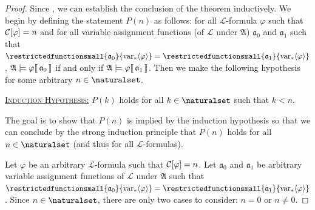 \begin{proof}
    Since , we can establish the conclusion
    of the theorem inductively.
    We begin by defining the statement \( P(n) \) as follows: for all \( \mathcal{L} \)-formula \( \varphi \) such that
    \( \folcomplexityofformula{\varphi} = n \) and for all variable assignment functions (of \( \mathcal{L} \) under \( \mathfrak{A} \))
    \( \mathfrak{a}_{0} \) and \( \mathfrak{a}_{1} \) such that
    \( \restrictedfunctionsmall{\mathfrak{a}_{0}}{ \folfreevars{\varphi} } = \restrictedfunctionsmall{\mathfrak{a}_{1}}{ \folfreevars{\varphi} } \),
    \(  \mathfrak{A} \models \varphi\llbracket\, \mathfrak{a}_{0} \,\rrbracket \) if and only if \(  \mathfrak{A} \models \varphi\llbracket\, \mathfrak{a}_{1} \,\rrbracket \).
    Then we make the following hypothesis for some arbitrary \( n \in \naturalset \).

    \vspace{0.3cm}
    \noindent
    \underline{\scshape Induction Hypothesis:} \( P(k) \) holds for all \( k \in \naturalset \) such that \( k < n \).

    \vspace{0.3cm}
    \noindent
    The goal is to show that \( P(n) \) is implied by the induction hypothesis so that we can conclude by the strong induction principle
    that \( P(n) \) holds for all \( n \in \naturalset \) (and thus for all \( \mathcal{L} \)-formulas).

    \vspace{0.3cm}
    \noindent
    Let \( \varphi \) be an arbitrary \( \mathcal{L} \)-formula such that \( \folcomplexityofformula{\varphi} = n \).
    Let \( \mathfrak{a}_{0} \) and \( \mathfrak{a}_{1} \) be arbitrary variable assignment functions of \( \mathcal{L} \) under \( \mathfrak{A} \)
    such that \( \restrictedfunctionsmall{\mathfrak{a}_{0}}{ \folfreevars{\varphi} } = \restrictedfunctionsmall{\mathfrak{a}_{1}}{ \folfreevars{\varphi} } \).
    Since \( n \in \naturalset \), there are only two cases to consider: \( n = 0 \) or \( n \neq 0 \).


\end{proof}
